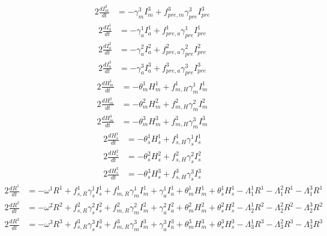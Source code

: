 \documentclass{article}%
\begin{document}
\begin{alignat}{2}%
\frac{dI_{m}^{3}}{dt} &= -\gamma_{m}^{3} I_{m}^{3} + f_{pre,m}^{3} \gamma_{pre}^{3} I_{pre}^{3}%
\end{alignat}%
\begin{alignat}{2}%
\frac{dI_{a}^{1}}{dt} &= -\gamma_{a}^{1} I_{a}^{1} + f_{pre,a}^{1} \gamma_{pre}^{1} I_{pre}^{1}%
\end{alignat}%
\begin{alignat}{2}%
\frac{dI_{a}^{2}}{dt} &= -\gamma_{a}^{2} I_{a}^{2} + f_{pre,a}^{2} \gamma_{pre}^{2} I_{pre}^{2}%
\end{alignat}%
\begin{alignat}{2}%
\frac{dI_{a}^{3}}{dt} &= -\gamma_{a}^{3} I_{a}^{3} + f_{pre,a}^{3} \gamma_{pre}^{3} I_{pre}^{3}%
\end{alignat}%
\begin{alignat}{2}%
\frac{dH_{m}^{1}}{dt} &= -\theta_{m}^{1} H_{m}^{1} + f_{m,H}^{1} \gamma_{m}^{1} I_{m}^{1}%
\end{alignat}%
\begin{alignat}{2}%
\frac{dH_{m}^{2}}{dt} &= -\theta_{m}^{2} H_{m}^{2} + f_{m,H}^{2} \gamma_{m}^{2} I_{m}^{2}%
\end{alignat}%
\begin{alignat}{2}%
\frac{dH_{m}^{3}}{dt} &= -\theta_{m}^{3} H_{m}^{3} + f_{m,H}^{3} \gamma_{m}^{3} I_{m}^{3}%
\end{alignat}%
\begin{alignat}{2}%
\frac{dH_{s}^{1}}{dt} &= -\theta_{s}^{1} H_{s}^{1} + f_{s,H}^{1} \gamma_{s}^{1} I_{s}^{1}%
\end{alignat}%
\begin{alignat}{2}%
\frac{dH_{s}^{2}}{dt} &= -\theta_{s}^{2} H_{s}^{2} + f_{s,H}^{2} \gamma_{s}^{2} I_{s}^{2}%
\end{alignat}%
\begin{alignat}{2}%
\frac{dH_{s}^{3}}{dt} &= -\theta_{s}^{3} H_{s}^{3} + f_{s,H}^{3} \gamma_{s}^{3} I_{s}^{3}%
\end{alignat}%
\begin{alignat}{2}%
\frac{dR^{1}}{dt} &= -\omega^{1} R^{1} + f_{s,R}^{1} \gamma_{s}^{1} I_{s}^{1} + f_{m,R}^{1} \gamma_{m}^{1} I_{m}^{1} +  \gamma_{a}^{1} I_{a}^{1} +  \theta_{m}^{1} H_{m}^{1} +  \theta_{s}^{1} H_{s}^{1} -\Lambda_{1}^{1} R^{1} -\Lambda_{1}^{2} R^{1} -\Lambda_{1}^{3} R^{1}%
\end{alignat}%
\begin{alignat}{2}%
\frac{dR^{2}}{dt} &= -\omega^{2} R^{2} + f_{s,R}^{2} \gamma_{s}^{2} I_{s}^{2} + f_{m,R}^{2} \gamma_{m}^{2} I_{m}^{2} +  \gamma_{a}^{2} I_{a}^{2} +  \theta_{m}^{2} H_{m}^{2} +  \theta_{s}^{2} H_{s}^{2} -\Lambda_{2}^{1} R^{2} -\Lambda_{2}^{2} R^{2} -\Lambda_{2}^{3} R^{2}%
\end{alignat}%
\begin{alignat}{2}%
\frac{dR^{3}}{dt} &= -\omega^{3} R^{3} + f_{s,R}^{3} \gamma_{s}^{3} I_{s}^{3} + f_{m,R}^{3} \gamma_{m}^{3} I_{m}^{3} +  \gamma_{a}^{3} I_{a}^{3} +  \theta_{m}^{3} H_{m}^{3} +  \theta_{s}^{3} H_{s}^{3} -\Lambda_{3}^{1} R^{3} -\Lambda_{3}^{2} R^{3} -\Lambda_{3}^{3} R^{3}%
\end{alignat}%
\end{document}
